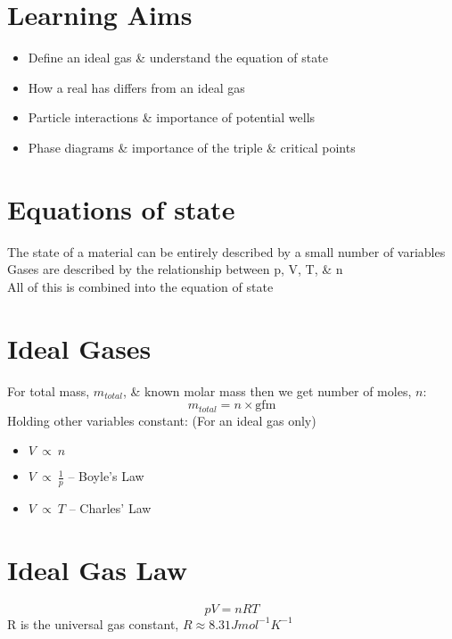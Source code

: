 \documentclass[a4paper, 11pt, fleqn, normalem]{report}
\begin{document}
\section*{Learning Aims}
\begin{itemize}
	\item Define an ideal gas \& understand the equation of state
	\item How a real has differs from an ideal gas
	\item Particle interactions \& importance of potential wells
	\item Phase diagrams \& importance of the triple \& critical points
\end{itemize}

\section*{Equations of state}
The state of a material can be entirely described by a small number of variables \\
Gases are described by the relationship between p, V, T, \& n \\
All of this is combined into the equation of state

\section*{Ideal Gases}
For total mass, $m_{total}$, \& known molar mass then we get number of moles, $n$:
\begin{equation*}
	m_{total} = n \times \text{gfm}
\end{equation*}
Holding other variables constant: (For an ideal gas only)
\vspace{-8pt}
\begin{itemize}
	\item $V~\propto~n$
	\item $V~\propto~\frac{1}{p}$ -- Boyle's Law
	\item $V~\propto~T$ -- Charles' Law
\end{itemize}

\section*{Ideal Gas Law}
\vspace{-24pt}
\begin{equation*}
	pV = nRT
\end{equation*}
R is the universal gas constant, $R \approx 8.31 J mol^{-1} K^{-1}$
\end{document}
